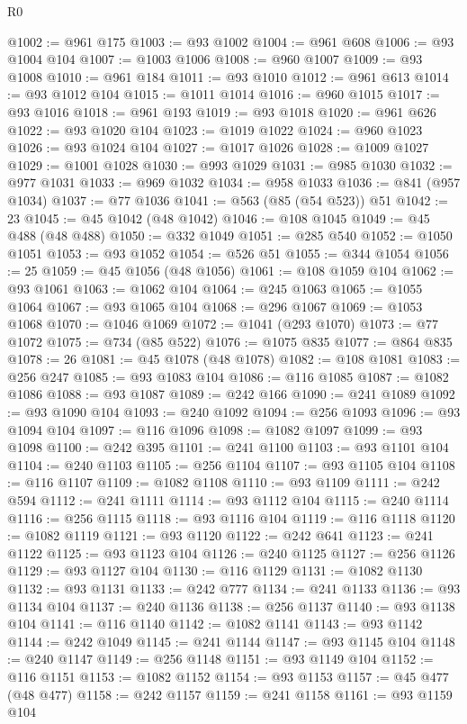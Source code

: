 \begin{lexlean}{R0}
\begin{coremodule}
@1002 := @961 @175
@1003 := @93 @1002
@1004 := @961 @608
@1006 := @93 @1004 @104
@1007 := @1003 @1006
@1008 := @960 @1007
@1009 := @93 @1008
@1010 := @961 @184
@1011 := @93 @1010
@1012 := @961 @613
@1014 := @93 @1012 @104
@1015 := @1011 @1014
@1016 := @960 @1015
@1017 := @93 @1016
@1018 := @961 @193
@1019 := @93 @1018
@1020 := @961 @626
@1022 := @93 @1020 @104
@1023 := @1019 @1022
@1024 := @960 @1023
@1026 := @93 @1024 @104
@1027 := @1017 @1026
@1028 := @1009 @1027
@1029 := @1001 @1028
@1030 := @993 @1029
@1031 := @985 @1030
@1032 := @977 @1031
@1033 := @969 @1032
@1034 := @958 @1033
@1036 := @841 (@957 @1034)
@1037 := @77 @1036
@1041 := @563 (@85 (@54 @523)) @51
@1042 := 23
@1045 := @45 @1042 (@48 @1042)
@1046 := @108 @1045
@1049 := @45 @488 (@48 @488)
@1050 := @332 @1049
@1051 := @285 @540
@1052 := @1050 @1051
@1053 := @93 @1052
@1054 := @526 @51
@1055 := @344 @1054
@1056 := 25
@1059 := @45 @1056 (@48 @1056)
@1061 := @108 @1059 @104
@1062 := @93 @1061
@1063 := @1062 @104
@1064 := @245 @1063
@1065 := @1055 @1064
@1067 := @93 @1065 @104
@1068 := @296 @1067
@1069 := @1053 @1068
@1070 := @1046 @1069
@1072 := @1041 (@293 @1070)
@1073 := @77 @1072
@1075 := @734 (@85 @522)
@1076 := @1075 @835
@1077 := @864 @835
@1078 := 26
@1081 := @45 @1078 (@48 @1078)
@1082 := @108 @1081
@1083 := @256 @247
@1085 := @93 @1083 @104
@1086 := @116 @1085
@1087 := @1082 @1086
@1088 := @93 @1087
@1089 := @242 @166
@1090 := @241 @1089
@1092 := @93 @1090 @104
@1093 := @240 @1092
@1094 := @256 @1093
@1096 := @93 @1094 @104
@1097 := @116 @1096
@1098 := @1082 @1097
@1099 := @93 @1098
@1100 := @242 @395
@1101 := @241 @1100
@1103 := @93 @1101 @104
@1104 := @240 @1103
@1105 := @256 @1104
@1107 := @93 @1105 @104
@1108 := @116 @1107
@1109 := @1082 @1108
@1110 := @93 @1109
@1111 := @242 @594
@1112 := @241 @1111
@1114 := @93 @1112 @104
@1115 := @240 @1114
@1116 := @256 @1115
@1118 := @93 @1116 @104
@1119 := @116 @1118
@1120 := @1082 @1119
@1121 := @93 @1120
@1122 := @242 @641
@1123 := @241 @1122
@1125 := @93 @1123 @104
@1126 := @240 @1125
@1127 := @256 @1126
@1129 := @93 @1127 @104
@1130 := @116 @1129
@1131 := @1082 @1130
@1132 := @93 @1131
@1133 := @242 @777
@1134 := @241 @1133
@1136 := @93 @1134 @104
@1137 := @240 @1136
@1138 := @256 @1137
@1140 := @93 @1138 @104
@1141 := @116 @1140
@1142 := @1082 @1141
@1143 := @93 @1142
@1144 := @242 @1049
@1145 := @241 @1144
@1147 := @93 @1145 @104
@1148 := @240 @1147
@1149 := @256 @1148
@1151 := @93 @1149 @104
@1152 := @116 @1151
@1153 := @1082 @1152
@1154 := @93 @1153
@1157 := @45 @477 (@48 @477)
@1158 := @242 @1157
@1159 := @241 @1158
@1161 := @93 @1159 @104

\end{coremodule}
\end{lexlean}
